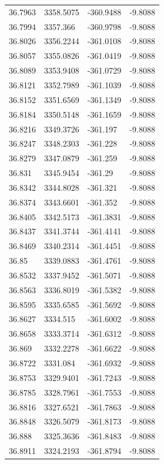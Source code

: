 \begin{table}[H]
\begin{tabular}{llll}
36.7963 & 3358.5075 & -360.9488 & -9.8088 \\
36.7994 & 3357.366 & -360.9798 & -9.8088 \\
36.8026 & 3356.2244 & -361.0108 & -9.8088 \\
36.8057 & 3355.0826 & -361.0419 & -9.8088 \\
36.8089 & 3353.9408 & -361.0729 & -9.8088 \\
36.8121 & 3352.7989 & -361.1039 & -9.8088 \\
36.8152 & 3351.6569 & -361.1349 & -9.8088 \\
36.8184 & 3350.5148 & -361.1659 & -9.8088 \\
36.8216 & 3349.3726 & -361.197 & -9.8088 \\
36.8247 & 3348.2303 & -361.228 & -9.8088 \\
36.8279 & 3347.0879 & -361.259 & -9.8088 \\
36.831 & 3345.9454 & -361.29 & -9.8088 \\
36.8342 & 3344.8028 & -361.321 & -9.8088 \\
36.8374 & 3343.6601 & -361.352 & -9.8088 \\
36.8405 & 3342.5173 & -361.3831 & -9.8088 \\
36.8437 & 3341.3744 & -361.4141 & -9.8088 \\
36.8469 & 3340.2314 & -361.4451 & -9.8088 \\
36.85 & 3339.0883 & -361.4761 & -9.8088 \\
36.8532 & 3337.9452 & -361.5071 & -9.8088 \\
36.8563 & 3336.8019 & -361.5382 & -9.8088 \\
36.8595 & 3335.6585 & -361.5692 & -9.8088 \\
36.8627 & 3334.515 & -361.6002 & -9.8088 \\
36.8658 & 3333.3714 & -361.6312 & -9.8088 \\
36.869 & 3332.2278 & -361.6622 & -9.8088 \\
36.8722 & 3331.084 & -361.6932 & -9.8088 \\
36.8753 & 3329.9401 & -361.7243 & -9.8088 \\
36.8785 & 3328.7961 & -361.7553 & -9.8088 \\
36.8816 & 3327.6521 & -361.7863 & -9.8088 \\
36.8848 & 3326.5079 & -361.8173 & -9.8088 \\
36.888 & 3325.3636 & -361.8483 & -9.8088 \\
36.8911 & 3324.2193 & -361.8794 & -9.8088 \\

\end{tabular}
\end{table}
